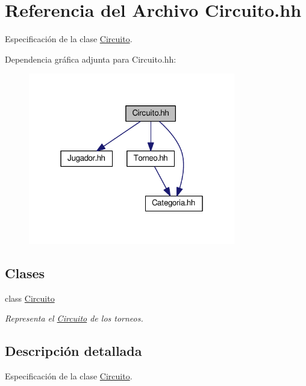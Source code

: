 \hypertarget{_circuito_8hh}{}\section{Referencia del Archivo Circuito.\+hh}
\label{_circuito_8hh}


Especificación de la clase \mbox{\hyperlink{class_circuito}{Circuito}}.  


Dependencia gráfica adjunta para Circuito.\+hh\+:\nopagebreak
\begin{figure}[H]
\begin{center}
\leavevmode
\includegraphics[width=256pt]{_circuito_8hh__incl}
\end{center}
\end{figure}
\subsection*{Clases}
\begin{DoxyCompactItemize}
\item 
class \mbox{\hyperlink{class_circuito}{Circuito}}
\begin{DoxyCompactList}\small\item\em Representa el \mbox{\hyperlink{class_circuito}{Circuito}} de los torneos. \end{DoxyCompactList}\end{DoxyCompactItemize}


\subsection{Descripción detallada}
Especificación de la clase \mbox{\hyperlink{class_circuito}{Circuito}}. 

